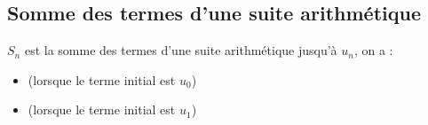\documentclass[12pt,a4paper]{article}
\begin{document}
\subsection{Somme des termes d'une suite arithmétique}




\begin{mybilan}
	 $S_n$ est la somme des termes d'une suite arithmétique jusqu'à $u_n$, on a :
	\begin{itemize}
		\item {} (lorsque le terme initial est $u_0$) 
		\item {} (lorsque le terme initial est $u_1$)
	\end{itemize}
\end{mybilan}
\end{document}
